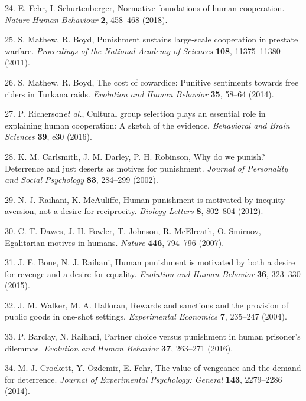 \documentclass[
  english,
  man, donotrepeattitle,floatsintext]{apa6}
\newenvironment{cslreferences}%
  {}%
  {\par}
\begin{document}
\begin{cslreferences}
\leavevmode\hypertarget{ref-Fehr2018}{}%
24. E. Fehr, I. Schurtenberger, Normative foundations of human cooperation. \emph{Nature Human Behaviour} \textbf{2}, 458--468 (2018).

\leavevmode\hypertarget{ref-Mathew2011}{}%
25. S. Mathew, R. Boyd, Punishment sustains large-scale cooperation in prestate warfare. \emph{Proceedings of the National Academy of Sciences} \textbf{108}, 11375--11380 (2011).

\leavevmode\hypertarget{ref-Mathew2014}{}%
26. S. Mathew, R. Boyd, The cost of cowardice: Punitive sentiments towards free riders in Turkana raids. \emph{Evolution and Human Behavior} \textbf{35}, 58--64 (2014).

\leavevmode\hypertarget{ref-Richerson2016}{}%
27. P. Richerson\emph{et al.}, Cultural group selection plays an essential role in explaining human cooperation: A sketch of the evidence. \emph{Behavioral and Brain Sciences} \textbf{39}, e30 (2016).

\leavevmode\hypertarget{ref-Carlsmith2002}{}%
28. K. M. Carlsmith, J. M. Darley, P. H. Robinson, Why do we punish? Deterrence and just deserts as motives for punishment. \emph{Journal of Personality and Social Psychology} \textbf{83}, 284--299 (2002).

\leavevmode\hypertarget{ref-Raihani2012b}{}%
29. N. J. Raihani, K. McAuliffe, Human punishment is motivated by inequity aversion, not a desire for reciprocity. \emph{Biology Letters} \textbf{8}, 802--804 (2012).

\leavevmode\hypertarget{ref-Dawes2007}{}%
30. C. T. Dawes, J. H. Fowler, T. Johnson, R. McElreath, O. Smirnov, Egalitarian motives in humans. \emph{Nature} \textbf{446}, 794--796 (2007).

\leavevmode\hypertarget{ref-Bone2015}{}%
31. J. E. Bone, N. J. Raihani, Human punishment is motivated by both a desire for revenge and a desire for equality. \emph{Evolution and Human Behavior} \textbf{36}, 323--330 (2015).

\leavevmode\hypertarget{ref-Walker2004}{}%
32. J. M. Walker, M. A. Halloran, Rewards and sanctions and the provision of public goods in one-shot settings. \emph{Experimental Economics} \textbf{7}, 235--247 (2004).

\leavevmode\hypertarget{ref-Barclay2016}{}%
33. P. Barclay, N. Raihani, Partner choice versus punishment in human prisoner's dilemmas. \emph{Evolution and Human Behavior} \textbf{37}, 263--271 (2016).

\leavevmode\hypertarget{ref-Crockett2014}{}%
34. M. J. Crockett, Y. Özdemir, E. Fehr, The value of vengeance and the demand for deterrence. \emph{Journal of Experimental Psychology: General} \textbf{143}, 2279--2286 (2014).


\end{cslreferences}
\end{document}
